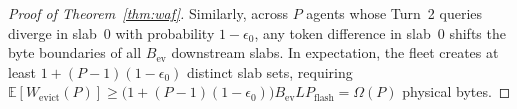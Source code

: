 \documentclass[pdflatex,sn-mathphys-num]{sn-jnl}
\theoremstyle{thmstyleone}
\newcommand{\E}{\mathbb{E}}
\begin{document}
\begin{appendices}
\begin{proof}[Proof of Theorem~\ref{thm:waf}]
Similarly, across $P$ agents whose Turn~2 queries diverge in slab~0 with probability $1 - \epsilon_0$, any token difference in slab~0 shifts the byte boundaries of all $B_{\mathrm{ev}}$ downstream slabs. In expectation, the fleet creates at least $1 + (P - 1)(1 - \epsilon_0)$ distinct slab sets, requiring $\E[W_{\mathrm{evict}}(P)] \ge \big(1 + (P - 1)(1 - \epsilon_0)\big) B_{\mathrm{ev}} L P_{\mathrm{flash}} = \Omega(P)$ physical bytes.
\end{proof}

\end{appendices}


\end{document}

